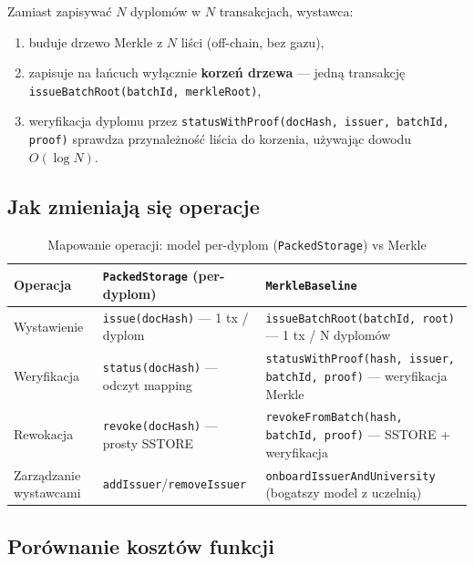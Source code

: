 \documentclass[11pt,a4paper]{article}
\begin{document}
Zamiast zapisywać \(N\) dyplomów w \(N\) transakcjach, wystawca:
\begin{enumerate}
  \item buduje drzewo Merkle z \(N\) liści (off-chain, bez gazu),
  \item zapisuje na łańcuch wyłącznie \textbf{korzeń drzewa} ---
        jedną transakcję \texttt{issueBatchRoot(batchId, merkleRoot)},
  \item weryfikacja dyplomu przez \texttt{statusWithProof(docHash, issuer, batchId, proof)}
        sprawdza przynależność liścia do korzenia, używając dowodu $O(\log N)$.
\end{enumerate}

\subsection{Jak zmieniają się operacje}

\begin{table}[H]
\centering
\caption{Mapowanie operacji: model per-dyplom (\texttt{PackedStorage}) vs Merkle}
\begin{tabular}{p{3.5cm} p{4.5cm} p{5.5cm}}
\toprule
Operacja & \texttt{PackedStorage} (per-dyplom) & \texttt{MerkleBaseline} \\
\midrule
Wystawienie & \texttt{issue(docHash)} --- 1 tx / dyplom & \texttt{issueBatchRoot(batchId, root)} --- 1 tx / N dyplomów \\[4pt]
Weryfikacja & \texttt{status(docHash)} --- odczyt mapping & \texttt{statusWithProof(hash, issuer, batchId, proof)} --- weryfikacja Merkle \\[4pt]
Rewokacja & \texttt{revoke(docHash)} --- prosty SSTORE & \texttt{revokeFromBatch(hash, batchId, proof)} --- SSTORE + weryfikacja \\[4pt]
Zarządzanie wystawcami & \texttt{addIssuer}/\texttt{removeIssuer} & \texttt{onboardIssuerAndUniversity} (bogatszy model z uczelnią) \\
\bottomrule
\end{tabular}
\end{table}

\subsection{Porównanie kosztów funkcji}
\end{document}
